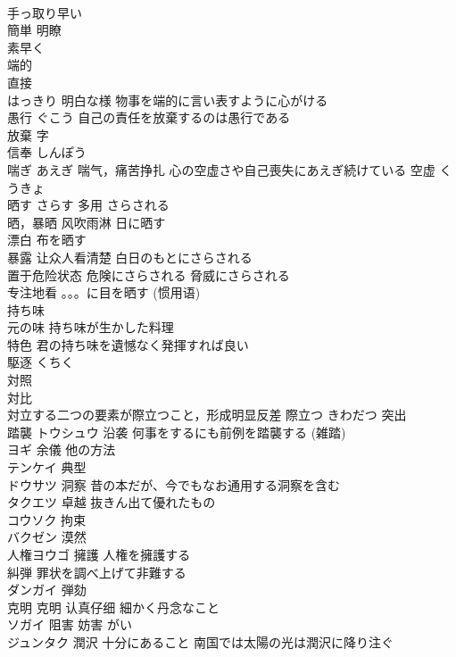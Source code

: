 \documentclass[8pt]{extreport}
\begin{document}
\begin{CJK}{UTF8}{min}
\\	手っ取り早い	
\\	簡単 明瞭 
\\	素早く
\\	端的	
\\	直接 
\\	はっきり 明白な様 物事を端的に言い表すように心がける
\\	愚行	ぐこう 自己の責任を放棄するのは愚行である
\\	放棄	字
\\	信奉	しんぽう
\\	喘ぎ	あえぎ 喘气，痛苦挣扎 心の空虚さや自己喪失にあえぎ続けている 空虚 くうきょ
\\	晒す	さらす 多用 さらされる 
\\	晒，暴晒 风吹雨淋 日に晒す 
\\	漂白 布を晒す 
\\	暴露 让众人看清楚 白日のもとにさらされる 
\\	置于危险状态 危険にさらされる 脅威にさらされる 
\\	专注地看 。。。に目を晒す (惯用语)
\\	持ち味	
\\	元の味 持ち味が生かした料理 
\\	特色 君の持ち味を遺憾なく発揮すれば良い
\\	駆逐	くちく
\\	対照	
\\	対比 
\\	対立する二つの要素が際立つこと，形成明显反差 際立つ きわだつ 突出
\\	踏襲	トウシュウ 沿袭 何事をするにも前例を踏襲する (雑踏)
\\	ヨギ	余儀 他の方法
\\	テンケイ	典型
\\	ドウサツ	洞察 昔の本だが、今でもなお通用する洞察を含む
\\	タクエツ	卓越 抜きん出て優れたもの
\\	コウソク	拘束
\\	バクゼン	漠然
\\	人権ヨウゴ	擁護 人権を擁護する
\\	糾弾	罪状を調べ上げて非難する
\\	ダンガイ	弾劾
\\	克明	克明 认真仔细 細かく丹念なこと
\\	ソガイ	阻害 妨害 がい
\\	ジュンタク	潤沢 十分にあること 南国では太陽の光は潤沢に降り注ぐ

\end{CJK}
\end{document}
